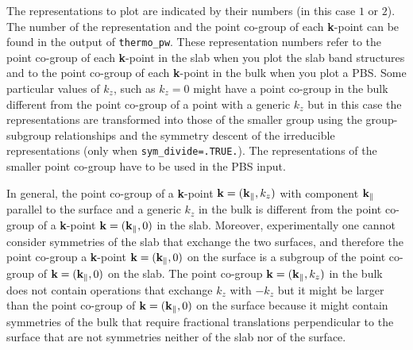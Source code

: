 \documentclass[12pt,a4paper,twoside]{report}
\begin{document}
The representations to plot are indicated by their numbers 
(in this case $1$ or $2$).
The number of the representation and the point co-group of each 
{\bf k}-point can be found in the output of \texttt{thermo\_pw}.
These representation numbers refer to the point co-group of each 
{\bf k}-point in the slab when you plot the slab band structures and 
to the point co-group of each {\bf k}-point in the bulk when you plot 
a PBS. Some particular values of $k_z$, such as $k_z=0$
might have a point co-group in the bulk different from the 
point co-group of a point with a generic $k_z$ but in this
case the representations are transformed into those of the smaller
group using the group-subgroup relationships and
the symmetry descent of the irreducible representations
(only when \texttt{sym\_divide=.TRUE.}). The representations of the
smaller point co-group have to be used in the PBS input.

In general, the point co-group of a {\bf k}-point 
${\bf k}=({\bf k}_\parallel, 
k_z)$ with component ${\bf k}_\parallel$ parallel to the surface 
and a generic $k_z$ in the bulk is different 
from the point co-group of a {\bf k}-point ${\bf k}=({\bf k}_\parallel, 0)$ 
in the slab. Moreover, experimentally one cannot consider symmetries
of the slab that exchange the two surfaces, and therefore the 
point co-group a {\bf k}-point ${\bf k}=({\bf k}_\parallel, 0)$ on the surface
is a subgroup of the point co-group of ${\bf k}=({\bf k}_\parallel, 0)$
on the slab. The point co-group ${\bf k}=({\bf k}_\parallel, k_z)$ 
in the bulk does not contain operations that exchange $k_z$ 
with $-k_z$
but it might be larger than the point co-group of 
${\bf k}=({\bf k}_\parallel, 0)$ on the surface because
it might contain symmetries of the bulk that require fractional translations
perpendicular to the surface that are not symmetries neither of the slab nor of
the surface.
\end{document}
